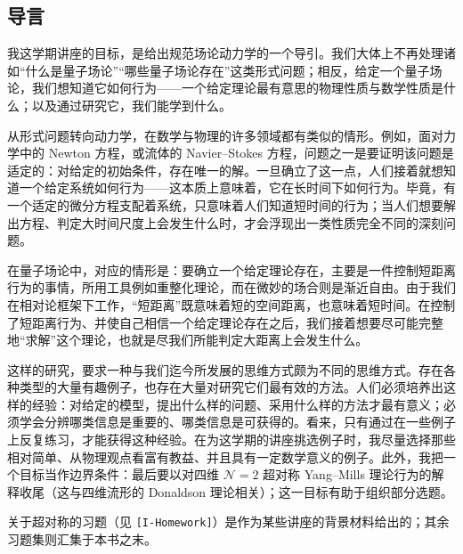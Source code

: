 \subsection*{导言}

我这学期讲座的目标，是给出规范场论动力学的一个导引。我们大体上不再处理诸如“什么是量子场论”“哪些量子场论存在”这类形式问题；相反，给定一个量子场论，我们想知道它如何行为——一个给定理论最有意思的物理性质与数学性质是什么；以及通过研究它，我们能学到什么。

从形式问题转向动力学，在数学与物理的许多领域都有类似的情形。例如，面对力学中的 Newton 方程，或流体的 Navier--Stokes 方程，问题之一是要证明该问题是适定的：对给定的初始条件，存在唯一的解。一旦确立了这一点，人们接着就想知道一个给定系统如何行为——这本质上意味着，它在长时间下如何行为。毕竟，有一个适定的微分方程支配着系统，只意味着人们知道短时间的行为；当人们想要解出方程、判定大时间尺度上会发生什么时，才会浮现出一类性质完全不同的深刻问题。

在量子场论中，对应的情形是：要确立一个给定理论存在，主要是一件控制短距离行为的事情，所用工具例如重整化理论，而在微妙的场合则是渐近自由。由于我们在相对论框架下工作，“短距离”既意味着短的空间距离，也意味着短时间。在控制了短距离行为、并使自己相信一个给定理论存在之后，我们接着想要尽可能完整地“求解”这个理论，也就是尽我们所能判定大距离上会发生什么。

这样的研究，要求一种与我们迄今所发展的思维方式颇为不同的思维方式。存在各种类型的大量有趣例子，也存在大量对研究它们最有效的方法。人们必须培养出这样的经验：对给定的模型，提出什么样的问题、采用什么样的方法才最有意义；必须学会分辨哪类信息是重要的、哪类信息是可获得的。看来，只有通过在一些例子上反复练习，才能获得这种经验。在为这学期的讲座挑选例子时，我尽量选择那些相对简单、从物理观点看富有教益、并且具有一定数学意义的例子。此外，我把一个目标当作边界条件：最后要以对四维 $\mathcal{N}=2$ 超对称 Yang--Mills 理论行为的解释收尾（这与四维流形的 Donaldson 理论相关）；这一目标有助于组织部分选题。

关于超对称的习题（见 \texttt{[I-Homework]}）是作为某些讲座的背景材料给出的；其余习题集则汇集于本书之末。
